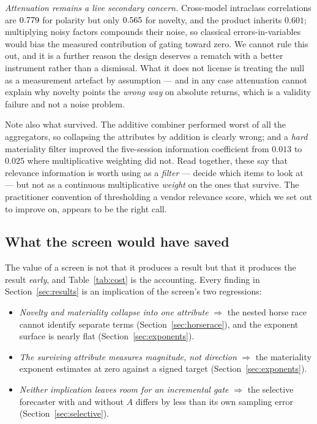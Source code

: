 \documentclass[preprint,12pt,authoryear]{elsarticle}
\theoremstyle{plain}
\theoremstyle{remark}
\begin{document}
\emph{Attenuation remains a live secondary concern.} Cross-model intraclass
correlations are $0.779$ for polarity but only $0.565$ for novelty, and the
product inherits $0.601$; multiplying noisy factors compounds their noise, so
classical errors-in-variables would bias the measured contribution of gating
toward zero. We cannot rule this out, and it is a further reason the design
deserves a rematch with a better instrument rather than a dismissal. What it does
not license is treating the null as a measurement artefact by assumption --- and
in any case attenuation cannot explain why novelty points the \emph{wrong way} on
absolute returns, which is a validity failure and not a noise problem.

Note also what survived. The additive combiner performed worst of all the
aggregators, so collapsing the attributes by addition is clearly wrong; and a
\emph{hard} materiality filter improved the five-session information coefficient
from $0.013$ to $0.025$ where multiplicative weighting did not. Read together,
these say that relevance information is worth using as a \emph{filter} --- decide
which items to look at --- but not as a continuous multiplicative \emph{weight}
on the ones that survive. The practitioner convention of thresholding a vendor
relevance score, which we set out to improve on, appears to be the right call.

\subsection{What the screen would have saved}\label{sec:saved}

The value of a screen is not that it produces a result but that it produces the
result \emph{early}, and Table~\ref{tab:cost} is the accounting. Every finding in
Section~\ref{sec:results} is an implication of the screen's two regressions:

\begin{itemize}
\item \emph{Novelty and materiality collapse into one attribute} $\Rightarrow$
  the nested horse race cannot identify separate terms
  (Section~\ref{sec:horserace}), and the exponent surface is nearly flat
  (Section~\ref{sec:exponents}).
\item \emph{The surviving attribute measures magnitude, not direction}
  $\Rightarrow$ the materiality exponent estimates at zero against a signed
  target (Section~\ref{sec:exponents}).
\item \emph{Neither implication leaves room for an incremental gate}
  $\Rightarrow$ the selective forecaster with and without $A$ differs by less
  than its own sampling error (Section~\ref{sec:selective}).
\end{itemize}
\end{document}
